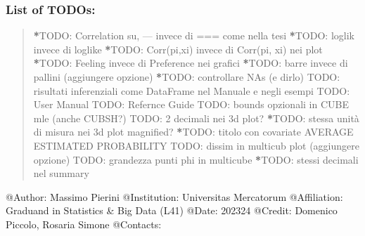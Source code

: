 \documentclass[letterpaper,10pt,english]{sphinxmanual}
\begin{document}
\subsubsection{List of TODOs:}
\label{\detokenize{cubmods:id255}}\begin{quote}

\sphinxAtStartPar
{\color{red}\bfseries{}*}TODO: Correlation su, — invece di === come nella tesi
{\color{red}\bfseries{}*}TODO: loglik invece di loglike
{\color{red}\bfseries{}*}TODO: Corr(pi,xi) invece di Corr(pi, xi) nei plot
{\color{red}\bfseries{}*}TODO: Feeling invece di Preference nei grafici
{\color{red}\bfseries{}*}TODO: barre invece di pallini (aggiungere opzione)
{\color{red}\bfseries{}*}TODO: controllare NAs (e dirlo)
TODO: risultati inferenziali come DataFrame nel Manuale e negli esempi
TODO: User Manual
TODO: Refernce Guide
TODO: bounds opzionali in CUBE mle (anche CUBSH?)
TODO: 2 decimali nei 3d plot?
{\color{red}\bfseries{}*}TODO: stessa unità di misura nei 3d plot magnified?
{\color{red}\bfseries{}*}TODO: titolo con covariate AVERAGE ESTIMATED PROBABILITY
TODO: dissim in multicub plot (aggiungere opzione)
TODO: grandezza punti phi in multicube
{\color{red}\bfseries{}*}TODO: stessi decimali nel summary
\end{quote}

\sphinxAtStartPar
@Author:      Massimo Pierini
@Institution: Universitas Mercatorum
@Affiliation: Graduand in Statistics \& Big Data (L41)
@Date:        2023\sphinxhyphen{}24
@Credit:      Domenico Piccolo, Rosaria Simone
@Contacts:    
\end{document}
